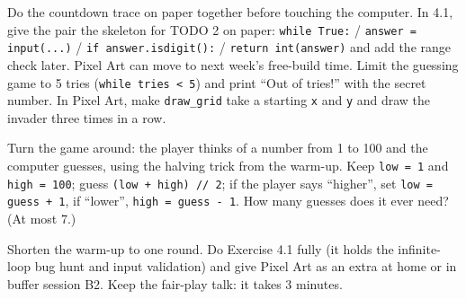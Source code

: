 \begin{differentiation}
\supportpath Do the countdown trace on paper together before touching the computer. In 4.1, give the pair the skeleton for TODO 2 on paper:
\texttt{while True:} / \texttt{answer = input(...)} / \texttt{if answer.isdigit():} / \texttt{return int(answer)} and add the range check later.
Pixel Art can move to next week's free-build time.
\extensionpath Limit the guessing game to 5 tries (\texttt{while tries < 5}) and print \enquote{Out of tries!} with the secret number.
In Pixel Art, make \texttt{draw\_grid} take a starting \texttt{x} and \texttt{y} and draw the invader three times in a row.
\end{differentiation}

\begin{stretchchallenge}
Turn the game around: the player thinks of a number from 1 to 100 and the computer guesses, using the halving trick from the warm-up.
Keep \texttt{low = 1} and \texttt{high = 100}; guess \texttt{(low + high) // 2}; if the player says \enquote{higher}, set \texttt{low = guess + 1},
if \enquote{lower}, \texttt{high = guess - 1}. How many guesses does it ever need? (At most 7.)
\end{stretchchallenge}

\begin{teachernote}
Shorten the warm-up to one round. Do Exercise 4.1 fully (it holds the infinite-loop bug hunt and input validation) and give Pixel Art
as an extra at home or in buffer session B2. Keep the fair-play talk: it takes 3 minutes.
\end{teachernote}
